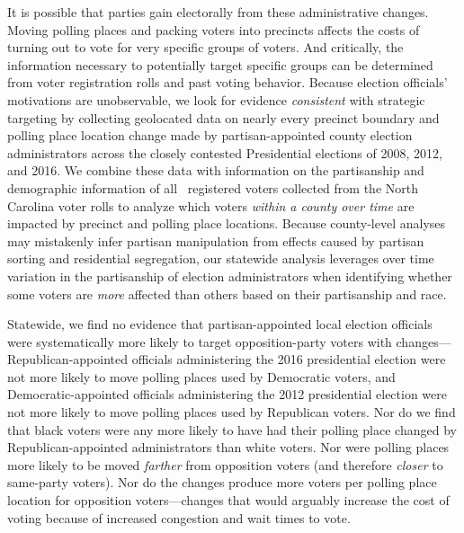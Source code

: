 \documentclass[12pt]{article}
\begin{document}
It is possible that parties gain electorally from these administrative changes.  Moving polling places and packing voters into precincts affects the costs of turning out to vote for very specific groups of voters.  And critically, the information necessary to potentially target specific groups can be determined from voter registration rolls and past voting behavior.  Because election officials' motivations are unobservable, we look for evidence \emph{consistent} with strategic targeting by collecting geolocated data on nearly every precinct boundary and polling place location change made by partisan-appointed county election administrators across the closely contested Presidential elections of 2008, 2012, and 2016. We combine these data with information on the partisanship and demographic information of all \unskip~registered voters collected from the North Carolina voter rolls to analyze which voters \emph{within a county over time} are impacted by precinct and polling place locations. Because county-level analyses may mistakenly infer partisan manipulation from effects caused by partisan sorting and residential segregation, our statewide analysis leverages over time variation in the partisanship of election administrators when identifying whether some voters are \emph{more} affected than others based on their partisanship and race. %

Statewide, we find no evidence that partisan-appointed local election officials were systematically more likely to target opposition-party voters with changes---Republican-appointed officials administering the 2016 presidential election were not more likely to move polling places used by Democratic voters, and Democratic-appointed officials administering the 2012 presidential election were not more likely to move polling places used by Republican voters.  Nor do we find that black voters were any more likely to have had their polling place changed by Republican-appointed administrators than white voters.  Nor were polling places more likely to be moved \emph{farther} from opposition voters (and therefore \emph{closer} to same-party voters). Nor do the changes produce more voters per polling place location for opposition voters---changes that would arguably increase the cost of voting because of increased congestion and wait times to vote.
\end{document}
